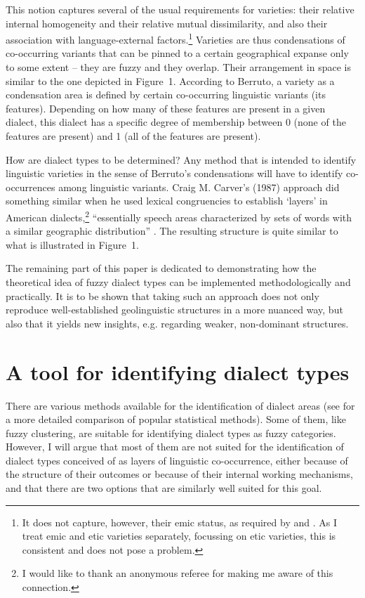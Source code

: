 \documentclass[output=paper]{LSP/langsci}
\begin{document}
This notion captures several of the usual requirements for varieties: their relative internal homogeneity and their relative mutual dissimilarity, and also their association with language-external factors.\footnote{   It does not capture, however, their emic status, as required by \citet[99]{auer_konversationelle_1986} and \citet[389--390]{lenz_struktur_2003}. As I treat emic and etic varieties separately, focussing on etic varieties, this is consistent and does not pose a problem.} Varieties are thus condensations of co-occurring variants that can be pinned to a certain geographical expanse only to some extent – they are fuzzy and they overlap. Their arrangement in space is similar to the one depicted in Figure~1. According to Berruto, a variety as a condensation area is defined by certain co-occurring linguistic variants (its features). Depending on how many of these features are present in a given dialect, this dialect has a specific degree of membership between 0 (none of the features are present) and 1 (all of the features are present).

How are dialect types to be determined? Any method that is intended to identify linguistic varieties in the sense of Berruto’s condensations will have to identify co-occurrences among linguistic variants. Craig M. Carver’s (1987) %
approach did something similar when he used lexical congruencies to establish ‘layers’ in American dialects,\footnote{I would like to thank an anonymous referee for making me aware of this connection.} “essentially speech areas characterized by sets of words with a similar geographic distribution” \citep[24]{boberg_north_2005}. The resulting structure is quite similar to what is illustrated in Figure~1. 

The remaining part of this paper is dedicated to demonstrating how the theoretical idea of fuzzy dialect types can be implemented methodologically and practically. It is to be shown that taking such an approach does not only reproduce well-established geolinguistic structures in a more nuanced way, but also that it yields new insights, e.g. regarding weaker, non-dominant structures.

\section{A tool for identifying dialect types}
There are various methods available for the identification of dialect areas (see \citealt{grieve_comparison_2014} for a more detailed comparison of popular statistical methods). Some of them, like fuzzy clustering, are suitable for identifying dialect types as fuzzy categories. However, I will argue that most of them are not suited for the identification of dialect types conceived of as layers of linguistic co-occurrence, either because of the structure of their outcomes or because of their internal working mechanisms, and that there are two options that are similarly well suited for this goal.
\end{document}

